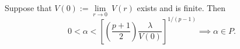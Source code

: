\newpage
\begin{lemma}\label{lya}
  Suppose that $V(0):=\underset{r\to0}{\lim}~V(r)$ exists and is finite.
  Then $$0<\alpha<\left[\left(\frac{p+1}{2}\right)\frac{\lambda}{V(0)} \right]^{1/(p-1)}\implies \alpha\in P.$$




\end{lemma}
